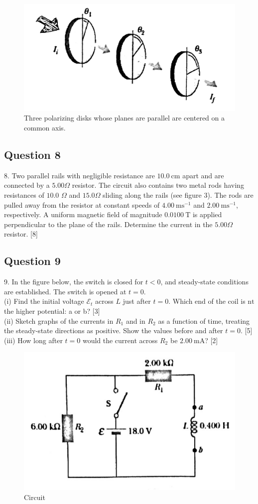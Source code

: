 \documentclass{article}
\begin{document}
\begin{figure}
	\centering
	\includegraphics[width=0.5\linewidth]{spho_book_TYS_images/2013q7.png}
	\caption{Three polarizing disks whose planes are parallel are centered on a common axis.}
\end{figure}


\subsection{Question 8}
8. Two parallel rails with negligible resistance are $10.0 \mathrm{~cm}$ apart and are connected by a $5.00 \Omega$ resistor. The circuit also contains two metal rods having resistances of $10.0$ $\Omega$ and $15.0 \Omega$ sliding along the rails (see figure 3). The rods are pulled away from the resistor at constant speeds of $4.00 \mathrm{~ms}^{-1}$ and $2.00 \mathrm{~ms}^{-1}$, respectively. A uniform magnetic field of magnitude $0.0100 \mathrm{~T}$ is applied perpendicular to the plane of the rails. Determine the current in the $5.00 \Omega$ resistor. [8]


\subsection{Question 9}
9. In the figure below, the switch is closed for $t<0$, and steady-state conditions are established. The switch is opened at $t=0$.\\
(i) Find the initial voltage $\mathcal{E}_{t}$ across $L$ just after $t=0$. Which end of the coil is $\mathrm{nt}$ the higher potential: a or b? [3]\\
(ii) Sketch graphs of the currents in $R_{1}$ and in $R_{2}$ as a function of time, treating the steady-state directions as positive. Show the values before and after $t=0$. [5] \\
(iii) How long after $t=0$ would the current across $R_2$ be $2.00 \mathrm{~mA}$? [2]


\begin{figure}
	\centering
	\includegraphics[width=0.5\linewidth]{spho_book_TYS_images/2013q9.png}
	\caption{Circuit}
\end{figure}
\end{document}
